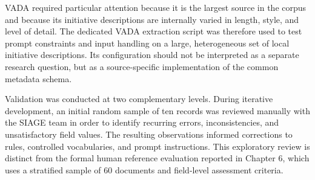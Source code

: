 VADA required particular attention because it is the largest source in the corpus
and because its initiative descriptions are internally varied in length, style, and
level of detail. The dedicated VADA extraction script was therefore used to test
prompt constraints and input handling on a large, heterogeneous set of local
initiative descriptions. Its configuration should not be interpreted as a separate
research question, but as a source-specific implementation of the common metadata
schema.

Validation was conducted at two complementary levels. During iterative
development, an initial random sample of ten records was reviewed manually with
the SIAGE team in order to identify recurring errors, inconsistencies, and
unsatisfactory field values. The resulting observations informed corrections to
rules, controlled vocabularies, and prompt instructions. This exploratory review is
distinct from the formal human reference evaluation reported in Chapter 6, which
uses a stratified sample of 60 documents and field-level assessment criteria.
